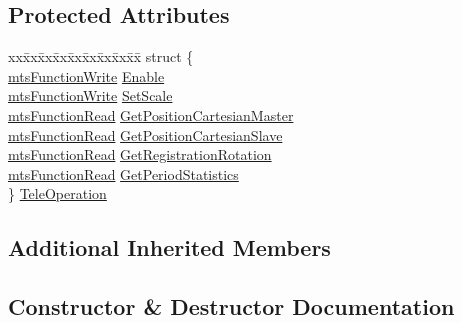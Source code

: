 \subsection*{Protected Attributes}
\begin{DoxyCompactItemize}
\item 
\begin{tabbing}
xx\=xx\=xx\=xx\=xx\=xx\=xx\=xx\=xx\=\kill
struct \{\\
\>\hyperlink{classmts_function_write}{mtsFunctionWrite} \hyperlink{classmts_tele_operation_qt_widget_ac031ba3e7dbdfba30b1f259a5109b7a7}{Enable}\\
\>\hyperlink{classmts_function_write}{mtsFunctionWrite} \hyperlink{classmts_tele_operation_qt_widget_ac2898212c3092185dd4a86dabfc8669e}{SetScale}\\
\>\hyperlink{classmts_function_read}{mtsFunctionRead} \hyperlink{classmts_tele_operation_qt_widget_a9ffb4a1017237ee19a112b598698fa64}{GetPositionCartesianMaster}\\
\>\hyperlink{classmts_function_read}{mtsFunctionRead} \hyperlink{classmts_tele_operation_qt_widget_a79f316cb32e00b6562055802ebe7303c}{GetPositionCartesianSlave}\\
\>\hyperlink{classmts_function_read}{mtsFunctionRead} \hyperlink{classmts_tele_operation_qt_widget_a304765452ec072593f21b09016ef74d2}{GetRegistrationRotation}\\
\>\hyperlink{classmts_function_read}{mtsFunctionRead} \hyperlink{classmts_tele_operation_qt_widget_a7ce8de289a4a1b48735de5ce6d278bc3}{GetPeriodStatistics}\\
\} \hyperlink{classmts_tele_operation_qt_widget_a729484b5b1127662661f4a2f35fe5252}{TeleOperation}\\

\end{tabbing}\end{DoxyCompactItemize}
\subsection*{Additional Inherited Members}


\subsection{Constructor \& Destructor Documentation}
\hypertarget{classmts_tele_operation_qt_widget_a332a9b14cae2e0d3effbfb6e7f89d8fa}{}
